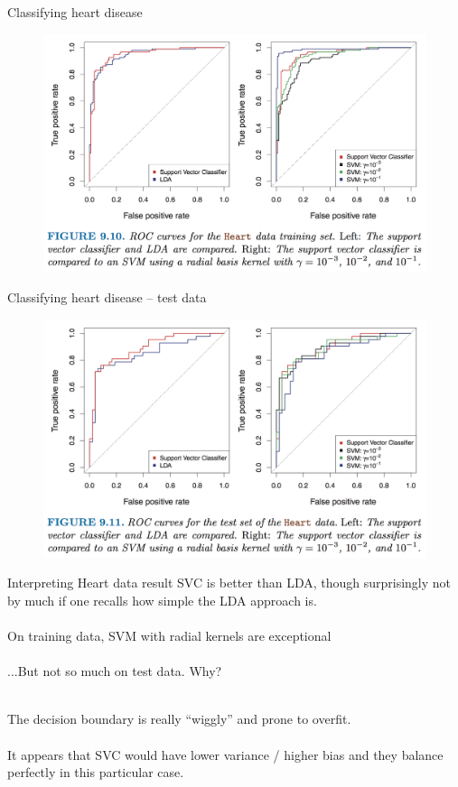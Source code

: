 \documentclass[mathserif, aspectratio=169]{beamer}
\begin{document}
\begin{frame}{Classifying heart disease}
\begin{figure}
\includegraphics[width=\textwidth]{fig9_10}
\caption*{}
\end{figure}
\end{frame}

\begin{frame}{Classifying heart disease -- test data}
\begin{figure}
\includegraphics[width=\textwidth]{fig9_11}
\caption*{}
\end{figure}
\end{frame}

\begin{frame}{Interpreting Heart data result}
SVC is better than LDA, though surprisingly not by much if one recalls how simple the LDA approach is.\\~\\

On training data, SVM with radial kernels are exceptional \\~\\

...But not so much on test data.  Why?\\~\\
\pause

The decision boundary is really ``wiggly'' and prone to overfit. \\~\\

It appears that SVC would have lower variance / higher bias and they balance perfectly in  this particular case.

\end{frame}
\end{document}
